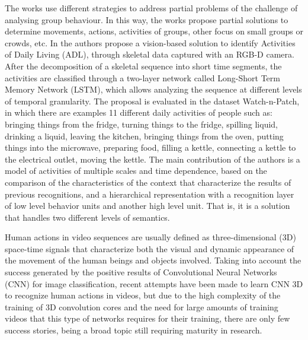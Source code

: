 The works use different strategies to address partial problems of the challenge of analysing group behaviour. In this way, the works propose partial solutions to determine movements, actions, activities of groups, other focus on small groups or crowds, etc. In \cite{devanne2019recognition} the authors propose a vision-based solution to identify Activities of Daily Living (ADL), through skeletal data captured with an RGB-D camera. After the decomposition of a skeletal sequence into short time segments, the activities are classified through a two-layer network called Long-Short Term Memory Network (LSTM), which allows analyzing the sequence at different levels of temporal granularity. The proposal is evaluated in the dataset Watch-n-Patch\cite{DBLP:journals/corr/WuZSSSS16}, in which there are examples 11 different daily activities of people such as: bringing things from the fridge, turning things to the fridge, spilling liquid, drinking a liquid, leaving the kitchen, bringing things from the oven, putting things into the microwave, preparing food, filling a kettle, connecting a kettle to the electrical outlet, moving the kettle. The main contribution of the authors is a model of activities of multiple scales and time dependence, based on the comparison of the characteristics of the context that characterize the results of previous recognitions, and a hierarchical representation with a recognition layer of low level behavior units and another high level unit. That is, it is a solution that handles two different levels of semantics.

Human actions in video sequences are usually defined as three-dimensional (3D) space-time signals that characterize both the visual and dynamic appearance of the movement of the human beings and objects involved. Taking into account the success generated by the positive results of Convolutional Neural Networks (CNN) for image classification, recent attempts have been made to learn CNN 3D to recognize human actions in videos, but due to the high complexity of the training of 3D convolution cores and the need for large amounts of training videos that this type of networks requires for their training, there are only few success stories, being a broad topic still requiring maturity in research. 

